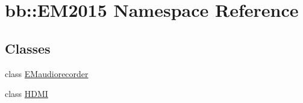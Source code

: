 \hypertarget{namespacebb_1_1_e_m2015}{}\section{bb\+:\+:E\+M2015 Namespace Reference}
\label{namespacebb_1_1_e_m2015}
\subsection*{Classes}
\begin{DoxyCompactItemize}
\item 
class \hyperlink{classbb_1_1_e_m2015_1_1_e_maudiorecorder}{E\+Maudiorecorder}
\item 
class \hyperlink{classbb_1_1_e_m2015_1_1_h_d_m_i}{H\+D\+M\+I}
\end{DoxyCompactItemize}
